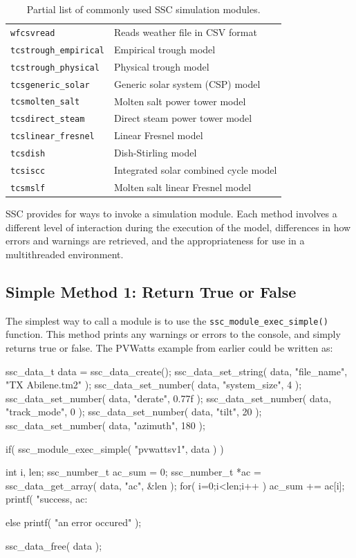 \documentclass{scrartcl} %
\begin{document}
\begin{table}
\begin{center}
\begin{tabular}{ll}
\texttt{wfcsvread} & Reads weather file in CSV format\\
\texttt{tcstrough\_empirical} & Empirical trough model\\
\texttt{tcstrough\_physical} & Physical trough model\\
\texttt{tcsgeneric\_solar} & Generic solar system (CSP) model\\
\texttt{tcsmolten\_salt} & Molten salt power tower model\\
\texttt{tcsdirect\_steam} & Direct steam power tower model\\
\texttt{tcslinear\_fresnel} & Linear Fresnel model\\
\texttt{tcsdish} & Dish-Stirling model\\
\texttt{tcsiscc} & Integrated solar combined cycle model\\
\texttt{tcsmslf} & Molten salt linear Fresnel model\\
\end{tabular}
\label{tab_modules}
\caption{Partial list of commonly used SSC simulation modules.}
\end{center}
\end{table}

SSC provides for ways to invoke a simulation module.  Each method involves a different level of interaction during the execution of the model, differences in how errors and warnings are retrieved, and the appropriateness for use in a multithreaded environment.

\subsection{Simple Method 1: Return True or False}

The simplest way to call a module is to use the \texttt{ssc\_module\_exec\_simple()} function.  This method prints any warnings or errors to the console, and simply returns true or false. The PVWatts example from earlier could be written as:

\begin{verbatimtab}[4]
ssc_data_t data = ssc_data_create();
ssc_data_set_string( data, "file_name", "TX Abilene.tm2" );
ssc_data_set_number( data, "system_size", 4 );
ssc_data_set_number( data, "derate", 0.77f );
ssc_data_set_number( data, "track_mode", 0 );
ssc_data_set_number( data, "tilt", 20 );
ssc_data_set_number( data, "azimuth", 180 );

if( ssc_module_exec_simple( "pvwattsv1", data ) )
{
	int i, len;
	ssc_number_t ac_sum = 0;
	ssc_number_t *ac = ssc_data_get_array( data, "ac", &len );
	for( i=0;i<len;i++ ) ac_sum += ac[i];
	printf( "success, ac: %

}
else
	printf( "an error occured\n" );

ssc_data_free( data );
\end{verbatimtab}
\end{document}
